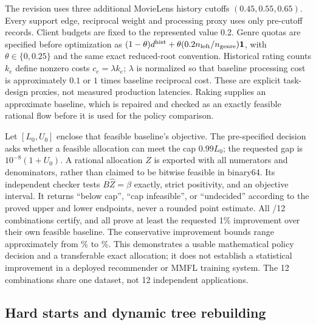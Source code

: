 The revision uses three additional MovieLens history cutoffs
$(0.45,0.55,0.65)$. Every support edge, reciprocal weight and processing proxy
uses only pre-cutoff records. Client budgets are fixed to the represented value
0.2. Genre quotas are specified before optimization as
$(1-\theta)d^{\rm hist}+\theta(0.2n_{\rm left}/n_{\rm genre})\mathbf{1}$, with
$\theta\in\{0,0.25\}$ and the same exact reduced-root convention. Historical
rating counts $k_e$ define nonzero costs $c_e=\lambda k_e$; $\lambda$ is
normalized so that baseline processing cost is approximately $0.1$ or $1$
times baseline reciprocal cost. These are explicit task-design proxies, not
measured production latencies. Raking supplies an approximate baseline, which
is repaired and checked as an exactly feasible rational flow before it is
used for the policy comparison.

Let $[L_0,U_0]$ enclose that feasible baseline's objective. The pre-specified
decision asks whether a feasible allocation can meet the cap $0.99L_0$;
the requested gap is $10^{-8}(1+U_0)$. A rational allocation $\widehat Z$
is exported with all numerators and denominators, rather than claimed to be
bitwise feasible in binary64. Its independent checker tests $B\widehat
Z=\beta$ exactly, strict positivity, and an objective interval. It returns
``below cap'', ``cap infeasible'', or ``undecided'' according to the proved
upper and lower endpoints, never a rounded point estimate. All
\AFiveWorkloadAccepted/12 combinations certify, and all prove at least the
requested 1\% improvement over their own feasible baseline. The conservative
improvement bounds range approximately from \AFiveImprovementMin\% to
\AFiveImprovementMax\%. This demonstrates a usable mathematical policy
decision and a transferable exact allocation; it does not establish a
statistical improvement in a deployed recommender or MMFL training system.
The 12 combinations share one dataset, not 12 independent applications.

\subsection{Hard starts and dynamic tree rebuilding}
\label{sec:a45-hard}

